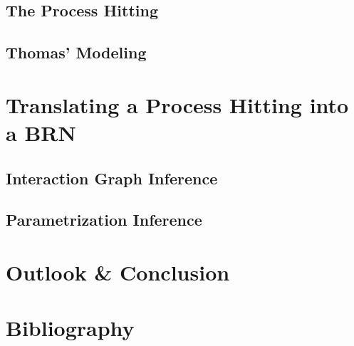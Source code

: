 \documentclass[fleqn,9pt,t]{beamer}
\begin{document}
\subsection{The Process Hitting}

\subsection{Thomas' Modeling}



\section{Translating a Process Hitting into a BRN}

\subsection{Interaction Graph Inference}

\subsection{Parametrization Inference}


\section{Outlook \& Conclusion}

\appendix
\section[x]{Bibliography}

\end{document}
